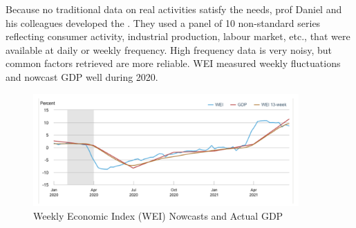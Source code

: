         Because no traditional data on real activities satisfy the needs, prof Daniel and his colleagues developed the . They used a panel of 10 non-standard series reflecting consumer activity, industrial production, labour market, etc., that were available at daily or weekly frequency. High frequency data is very noisy, but common factors retrieved are more reliable. WEI measured weekly fluctuations and nowcast GDP well during 2020.

        \begin{figure}[H]
            \centering
            \includegraphics[width=4in]{images/ch7/weekly eco index.png}
            \caption{Weekly Economic Index (WEI) Nowcasts and Actual GDP}
        \end{figure}
        